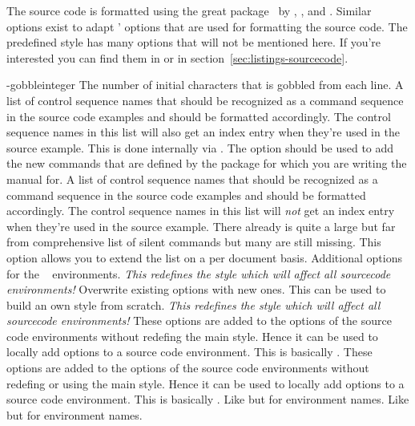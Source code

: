 \documentclass[load-preamble+]{cnltx-doc}
\newcommand*\file[1]{\code{#1}}
\begin{document}
The source code is formatted using the great 
package~\cite{pkg:listings} by \heinz, \moses, and \hoffmann.  Similar options
exist to adapt ' options that are used for formatting the source
code.  The predefined style has many options that will not be mentioned here.
If you're interested you can find them in \file{cnltx-example.sty} or in
section~\vref{sec:listings-sourcecode}.
\begin{options}
  \keyval-{gobble}{integer}
    The number of initial characters that is gobbled from each line.
  \Default
    A list of control sequence names that should be recognized as a command
    sequence in the source code examples and should be formatted accordingly.
    The control sequence names in this list will also get an index entry when
    they're used in the source example.  This is done internally via
    .  The option should be used to add the new commands that are
    defined by the package for which you are writing the manual for.
    A list of control sequence names that should be recognized as a command
    sequence in the source code examples and should be formatted accordingly.
    The control sequence names in this list will \emph{not} get an index entry
    when they're used in the source example.  There already is quite a large
    but far from comprehensive list of silent commands but many are still
    missing.  This option allows you to extend the list on a per document
    basis.
  \Default
    Additional options for the ~\cite{pkg:listings}
    environments.  \emph{This redefines the   style
      which will affect all sourcecode environments!}
    Overwrite existing options with new ones.  This can be used to build an own
    style from scratch.  \emph{This redefines the  
      style which will affect all sourcecode environments!}
    These options are added to the  options of
    the source code environments without redefing the main style.  Hence it
    can be used to locally add options to a source code environment.  This is
    basically .
    These options are added to the  options
    of the source code environments without redefing or using the main style.
    Hence it can be used to locally add options to a source code environment.
    This is basically .
  \Default
    Like  but for environment names.
    Like  but for environment names.
\end{options}
\end{document}
